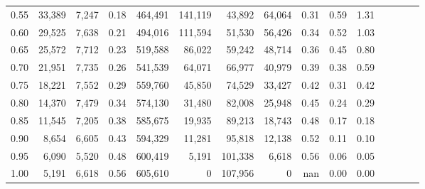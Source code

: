\begin{tabular}{rrrcrrrrrrrrrrr}
0.55 &  33,389 &  7,247 &                                       0.18 &  464,491 &  141,119 &   43,892 &   64,064 &  0.31 &  0.59 &                         1.31 \\
0.60 &  29,525 &  7,638 &                                       0.21 &  494,016 &  111,594 &   51,530 &   56,426 &  0.34 &  0.52 &                         1.03 \\
0.65 &  25,572 &  7,712 &                                       0.23 &  519,588 &   86,022 &   59,242 &   48,714 &  0.36 &  0.45 &                         0.80 \\
0.70 &  21,951 &  7,735 &                                       0.26 &  541,539 &   64,071 &   66,977 &   40,979 &  0.39 &  0.38 &                         0.59 \\
0.75 &  18,221 &  7,552 &                                       0.29 &  559,760 &   45,850 &   74,529 &   33,427 &  0.42 &  0.31 &                         0.42 \\
0.80 &  14,370 &  7,479 &                                       0.34 &  574,130 &   31,480 &   82,008 &   25,948 &  0.45 &  0.24 &                         0.29 \\
0.85 &  11,545 &  7,205 &                                       0.38 &  585,675 &   19,935 &   89,213 &   18,743 &  0.48 &  0.17 &                         0.18 \\
0.90 &   8,654 &  6,605 &                                       0.43 &  594,329 &   11,281 &   95,818 &   12,138 &  0.52 &  0.11 &                         0.10 \\
0.95 &   6,090 &  5,520 &                                       0.48 &  600,419 &    5,191 &  101,338 &    6,618 &  0.56 &  0.06 &                         0.05 \\
1.00 &   5,191 &  6,618 &                                       0.56 &  605,610 &        0 &  107,956 &        0 &   nan &  0.00 &                         0.00 \\
\bottomrule
\end{tabular}

